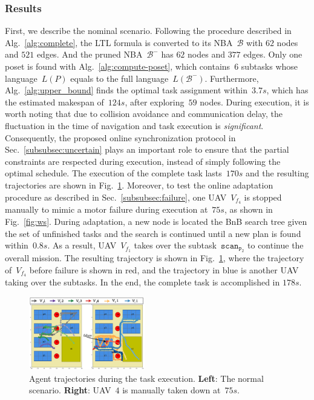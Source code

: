 \subsubsection{Results}\label{subsubsec:hw-results}
First, we describe the nominal scenario.
Following the procedure described in Alg.~\ref{alg:complete},
the LTL formula is converted to its NBA~$\mathcal{B}$ with $62$ nodes and $521$ edges.
And the pruned NBA~$\mathcal{B}^-$ has $62$ nodes and $377$ edges.
Only one poset is found with Alg.~\ref{alg:compute-poset},
which contains~$6$ subtasks whose language~$L(P)$ equals to the full language~$L(\mathcal{B}^-)$.
Furthermore, Alg.~\ref{alg:upper_bound} finds the
optimal task assignment within~$3.7s$,
which has the estimated makespan of~$124s$, after exploring~$59$ nodes.
During execution, it is worth noting that due to collision avoidance and communication delay,
the fluctuation in the time of navigation and task execution is \emph{significant}.
Consequently, the proposed online synchronization protocol in Sec.~\ref{subsubsec:uncertain}
plays an important role to ensure that the partial constraints
are respected during execution,
instead of simply following the optimal schedule.
The execution of the complete task lasts~$170s$ and
the resulting trajectories are shown in Fig.~\ref{fig:exp-trajs}.
Moreover, to test the online adaptation procedure
as described in Sec.~\ref{subsubsec:failure},
one UAV~$V_{f_4}$ is stopped manually to mimic a motor failure during execution at~$75s$,
as shown in Fig.~\ref{fig:ws}.
During adaptation, a new node is located the BnB search tree
given the set of unfinished tasks
and the search is continued until a new plan is found within~$0.8s$.
As a result, UAV~$V_{f_1}$ takes over the subtask~$\texttt{scan}_{\texttt{P}_2}$
to continue the overall mission.
The resulting trajectory is shown in Fig.~\ref{fig:exp-trajs},
where the trajectory of~$V_{f_4}$ before failure is shown in red,
and the trajectory in blue is another UAV taking over the subtasks.
In the end, the complete task is accomplished in $178s$.

\begin{figure}[t!]
	\centering
	\includegraphics[width=0.45\textwidth]{figures/hardware_experiment/figure_12.pdf}
	\caption{Agent trajectories during the task execution.
          \textbf{Left}: The normal scenario.
          \textbf{Right}: UAV~$4$ is manually taken down at~$75s$.}
        \label{fig:exp-trajs}
\end{figure}
